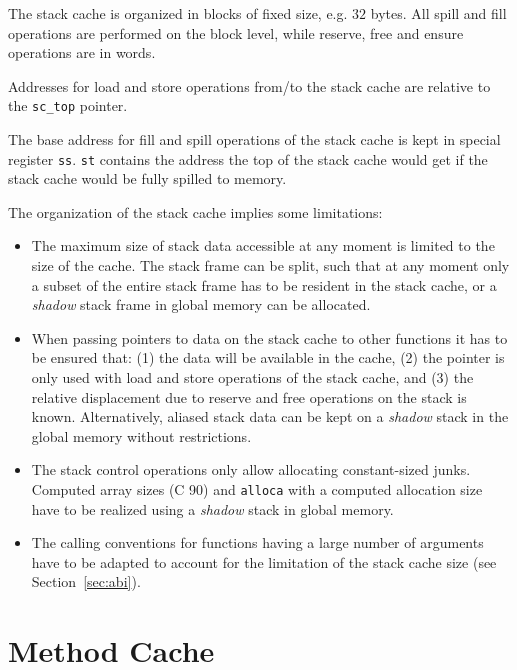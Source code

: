 \documentclass[a4paper,fontsize=10pt,twoside,DIV15,BCOR12mm,headinclude=true,footinclude=false,pagesize,bibtotoc]{scrbook}
\newcommand{\code}[1]{{\texttt{#1}}}
\newcommand{\comment}[3]{

\textsf{\textbf{#1}} {\color{#3}#2}}
\newcommand{\martin}[1]{\comment{Martin}{#1}{Blue}}
\renewcommand{\martin}[1]{}
\begin{document}
The stack cache is organized in blocks of fixed size, e.g. $32$ bytes. All
spill and fill operations are performed on the block level, while reserve, free
and ensure operations are in words.
\martin{We agreed that some size values are needed in the compiler to
generate correct code (soon). So we might bring in stack cache manipulation
in burst blocks as well.}

Addresses for load and store operations from/to the stack cache are relative to
the \code{sc\_top} pointer.

The base address for fill and spill operations of the stack cache is kept in
special register \texttt{ss}. \texttt{st} contains the address the top of the
stack cache would get if the stack cache would be fully spilled to memory.

The organization of the stack cache implies some limitations:
\begin{itemize}
  \item The maximum size of stack data accessible at any moment is limited to
        the size of the cache. The stack frame can be split, such that at any
        moment only a subset of the entire stack frame has to be resident in the
        stack cache, or a \emph{shadow} stack frame in global memory can be
        allocated.
  \item When passing pointers to data on the stack cache to other functions it
        has to be ensured that: (1) the data will be available in the cache, (2)
        the pointer is only used  with load and store operations of the stack
        cache, and (3) the relative displacement due to reserve and free
        operations on the stack is known. Alternatively, aliased stack data can
        be kept on a \emph{shadow} stack in the global memory without
        restrictions.
  \item The stack control operations only allow allocating constant-sized junks.
        Computed array sizes (C 90) and \texttt{alloca} with a computed
        allocation size have to be realized using a \emph{shadow} stack in
        global memory.
  \item The calling conventions for functions having a large number of arguments
        have to be adapted to account for the limitation of the stack cache
        size (see Section~\ref{sec:abi}).
\end{itemize}



\section{Method Cache}
\label{sec:method-cache}
\end{document}
